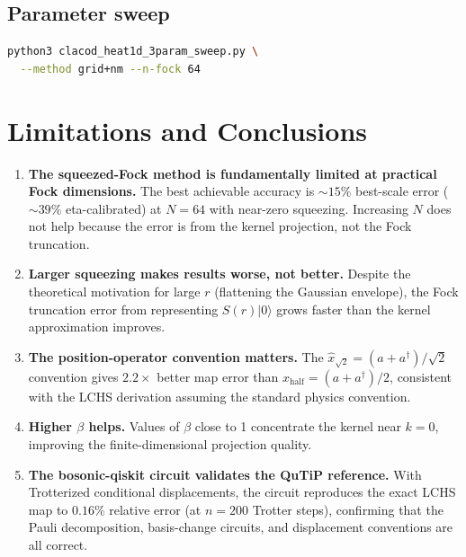 \documentclass[11pt]{article}
\begin{document}
\subsection{Parameter sweep}
\begin{lstlisting}[language=bash]
python3 clacod_heat1d_3param_sweep.py \
  --method grid+nm --n-fock 64
\end{lstlisting}

\section{Limitations and Conclusions}

\begin{enumerate}[itemsep=3pt]
  \item \textbf{The squeezed-Fock method is fundamentally limited at practical
        Fock dimensions.}
        The best achievable accuracy is $\sim\!15\%$ best-scale error ($\sim\!39\%$
        eta-calibrated) at $N = 64$ with near-zero squeezing.  Increasing $N$ does
        not help because the error is from the kernel projection, not the Fock
        truncation.

  \item \textbf{Larger squeezing makes results worse, not better.}
        Despite the theoretical motivation for large $r$ (flattening the
        Gaussian envelope), the Fock truncation error from representing
        $S(r)|0\rangle$ grows faster than the kernel approximation improves.

  \item \textbf{The position-operator convention matters.}
        The $\hat{x}_{\sqrt{2}} = (a+a^\dagger)/\sqrt{2}$ convention gives
        $2.2\times$ better map error than $\hat{x}_{\text{half}} = (a+a^\dagger)/2$,
        consistent with the LCHS derivation assuming the standard physics convention.

  \item \textbf{Higher $\beta$ helps.}
        Values of $\beta$ close to 1 concentrate the kernel near $k = 0$,
        improving the finite-dimensional projection quality.

  \item \textbf{The bosonic-qiskit circuit validates the QuTiP reference.}
        With Trotterized conditional displacements, the circuit reproduces
        the exact LCHS map to $0.16\%$ relative error (at $n=200$ Trotter steps),
        confirming that the Pauli decomposition, basis-change circuits, and
        displacement conventions are all correct.


\end{enumerate}
\end{document}

